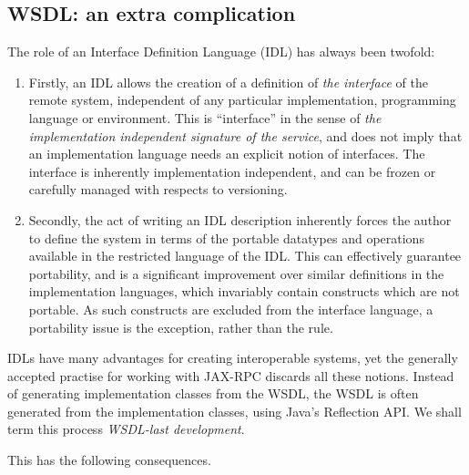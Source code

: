 \subsection{WSDL: an extra complication}
\label{objections:wsdl-gen}

The role of an Interface Definition Language (IDL) has always been
twofold:

\begin{enumerate}
\item Firstly, an IDL allows the creation of a definition of \emph{the
interface} of the remote system, independent of any particular
implementation, programming language or environment. This is
``interface'' in the sense of \emph{the implementation independent
signature of the service}, and does not imply that an implementation
language needs an explicit notion of interfaces. The interface is
inherently implementation independent, and can be frozen or carefully
managed with respects to versioning.

\item Secondly, the act of writing an IDL description inherently
forces the author to define the system in terms of the portable
datatypes and operations available in the restricted language of the
IDL.  This can effectively guarantee portability, and is a significant
improvement over similar definitions in the implementation languages,
which invariably contain constructs which are not portable. As such
constructs are excluded from the interface language, a portability
issue is the exception, rather than the rule.
\end{enumerate}

IDLs have many advantages for creating interoperable systems, yet the
generally accepted practise for working with JAX-RPC discards all
these notions. Instead of generating implementation classes from the
WSDL, the WSDL is often generated from the implementation classes,
using Java's Reflection API. We shall term this process
\emph{WSDL-last development}.

This has the following consequences.

